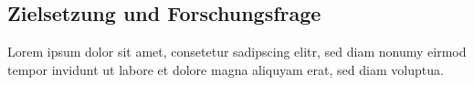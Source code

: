 \subsection{Zielsetzung und Forschungsfrage}\label{Zielsetzung}

Lorem ipsum dolor sit amet, consetetur sadipscing elitr, sed diam nonumy eirmod tempor invidunt ut labore et dolore magna aliquyam erat, sed diam voluptua.
